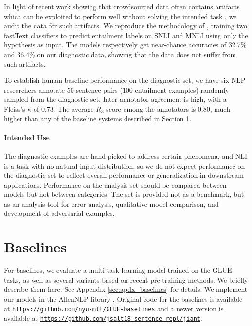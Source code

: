 In light of recent work showing that crowdsourced data often contains artifacts which can be exploited to perform well without solving the intended task 
\citep[][ i.a.]{schwartz17cloze,poliak2018hypothesis,TSUCHIYA18.786},
we audit the data for such artifacts.
We reproduce the methodology of \citet{gurudipta18artifacts},
training two fastText classifiers \citep{joulin2016bag} to predict entailment labels on SNLI and MNLI using only the hypothesis as input. 
The models respectively get near-chance accuracies of 32.7\% and 36.4\% on our diagnostic data, showing that the data does not suffer from such artifacts. 

To establish human baseline performance on the diagnostic set, we have six NLP researchers annotate 50 sentence pairs (100 entailment examples) randomly sampled from the diagnostic set. Inter-annotator agreement is high, with a Fleiss's \(\kappa\) of 0.73.
The average \(R_3\) score among the annotators is 0.80, much higher than any of the baseline systems described in Section \ref{sec:baselines}. 

\paragraph{Intended Use}
The diagnostic examples are hand-picked to address certain phenomena, and NLI is a task with no natural input distribution, so we do not expect performance on the diagnostic set to reflect overall performance or generalization in downstream applications. Performance on the analysis set should be compared between models but not between categories. The set is provided not as a benchmark, but as an analysis tool for error analysis, qualitative model comparison, and development of adversarial examples.

\section{Baselines}\label{sec:baselines}

For baselines, we evaluate a multi-task learning model trained on the GLUE tasks, as well as several variants based on recent pre-training methods.
We briefly describe them here. See Appendix \ref{sec:apdx_baselines} for details.
We implement our models in the AllenNLP library \citep{Gardner2017AllenNLPAD}.
Original code for the baselines is available at \texttt{\href{https://github.com/nyu-mll/GLUE-baselines}{https://github.com/nyu-mll/GLUE-baselines}} 
and a newer version is available at \texttt{\href{https://github.com/jsalt18-sentence-repl/jiant}{https://github.com/jsalt18-sentence-repl/jiant}}.

